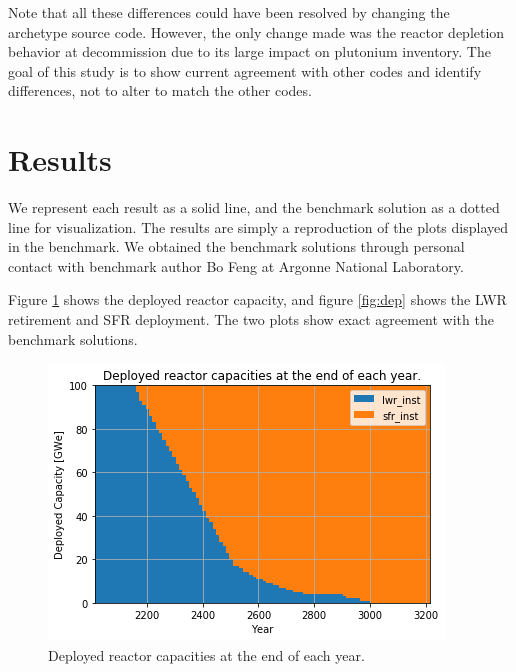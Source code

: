 Note that all these differences could have been resolved by changing the
archetype source code. However, the only change made was the reactor
depletion behavior at decommission due to its large impact on plutonium inventory.
The goal of this
study is to show current \Cyclus agreement with other codes and identify
differences, not to alter \Cyclus to match the other codes.

\section{Results}

We represent each \Cyclus result as a solid line, and the benchmark solution
as a dotted line for visualization. The results are
simply a reproduction of the plots displayed in the benchmark. 
We obtained the benchmark solutions through personal contact with
benchmark author Bo Feng at Argonne National Laboratory.



Figure \ref{fig:pow_plot} shows the deployed reactor capacity, and
figure \ref{fig:dep} shows the \gls{LWR} retirement and \gls{SFR}
deployment. The two plots show exact agreement with the
benchmark solutions.

\begin{figure}[htbp!]
	\begin{center}
		\includegraphics[scale=0.5]{./images/results_18/power_plot.png}
	\end{center}
	\caption{Deployed reactor capacities at the end of each year.}
	\label{fig:pow_plot}
\end{figure}


